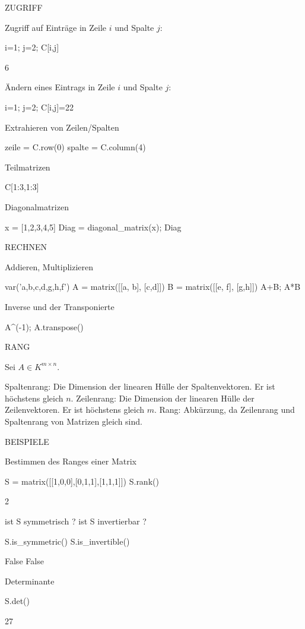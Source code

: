 \documentclass[fontsize=12pt,paper=a4,twoside,bibtotoc,idxtotoc,
liststotoc,pagesize,BCOR1.2cm,DIV15,chapterprefix,pagesize=pdftex]{scrbook}
\theoremstyle{plain}
\theoremstyle{definition}
\theoremstyle{remark}
\begin{document}
ZUGRIFF


 Zugriff auf Einträge in Zeile $i$ und Spalte $j$:
\begin{sagein}
i=1; j=2; C[i,j]
\end{sagein}
\begin{sage}
  6
\end{sage}
 Ändern eines Eintrags in Zeile $i$ und Spalte $j$:
\begin{sagein}
i=1; j=2; C[i,j]=22
\end{sagein}
 Extrahieren von Zeilen/Spalten
\begin{sagein}
zeile = C.row(0)
spalte = C.column(4)
\end{sagein}
 Teilmatrizen
\begin{sagein}
C[1:3,1:3]
\end{sagein}
 Diagonalmatrizen
\begin{sagein}
x = [1,2,3,4,5]
Diag = diagonal_matrix(x); Diag
\end{sagein}


RECHNEN

 
 Addieren, Multiplizieren
\begin{sagein}
var('a,b,c,d,g,h,f')
A = matrix([[a, b], [c,d]])
B = matrix([[e, f], [g,h]])
A+B; A*B
\end{sagein}
 Inverse und der Transponierte
\begin{sagein}
A^(-1); A.transpose()
\end{sagein}


RANG

Sei $A \in K^{m \times n}$. 

 {\color{red} Spaltenrang}: Die Dimension der linearen Hülle der Spaltenvektoren. Er ist höchstens gleich $n$.
 {\color{red} Zeilenrang}: Die Dimension der linearen Hülle der Zeilenvektoren. Er ist höchstens gleich $m$.
 {\color{red} Rang}: Abkürzung, da Zeilenrang und Spaltenrang von Matrizen gleich sind. 


BEISPIELE


 Bestimmen des Ranges einer Matrix
\begin{sagein}
S = matrix([[1,0,0],[0,1,1],[1,1,1]])
S.rank()
\end{sagein}
\begin{sage}
  2
\end{sage}
 ist S symmetrisch ? ist S invertierbar ?
\begin{sagein}
S.is_symmetric() 
S.is_invertible()
\end{sagein}
\begin{sage}
False
False
\end{sage}
 Determinante
\begin{sagein}
S.det()
\end{sagein}
\begin{sage}
  27
\end{sage}
\end{document}
